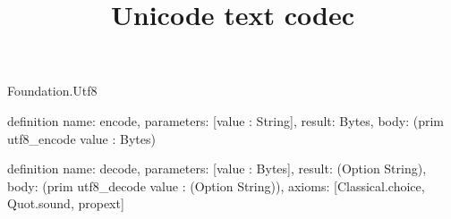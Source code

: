 \begin{lexlean}{Foundation.Utf8}
\title{Unicode text codec}
\begin{semanticmodule}
definition{
  name: encode,
  parameters: [value : String],
  result: Bytes,
  body: (prim utf8_encode value : Bytes)
}

definition{
  name: decode,
  parameters: [value : Bytes],
  result: (Option String),
  body: (prim utf8_decode value : (Option String)),
  axioms: [Classical.choice, Quot.sound, propext]
}
\end{semanticmodule}
\end{lexlean}
